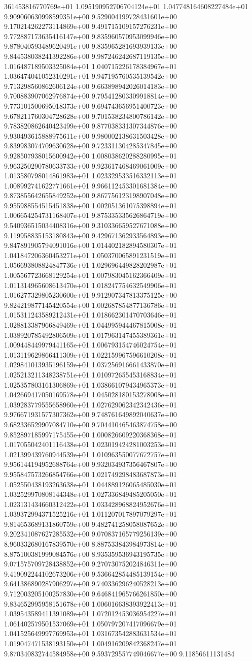 361453816770769e+01	1.095190952706704124e+01	1.047748164608227484e+01	9.909060630998599351e+00	9.529004199728431601e+00	9.170214262273114869e+00	9.491715109157276231e+00	9.772887173635416147e+00	9.835960570953099946e+00	9.878040593489620491e+00	9.835965281693939133e+00	9.844538038241392286e+00	9.987246242687119135e+00	1.016487189503325084e+01	1.040715226178384967e+01	1.036474041052310291e+01	9.947195760535139542e+00	9.713298560862606124e+00	9.663898942026014183e+00	9.700883907062976874e+00	9.795412803309918814e+00	9.773101500695018373e+00	9.694743656951400723e+00	9.678211760304728628e+00	9.701538234800786142e+00	9.783820862640423499e+00	9.877038331307344876e+00	9.930493615888975611e+00	9.980002138631503428e+00	9.839983074709630628e+00	9.723311304285347845e+00	9.928507938015600942e+00	1.008038620288280995e+01	9.963250290780633733e+00	9.923617468469061009e+00	1.013580798014861983e+01	1.023329533516332113e+01	1.008992741622771661e+01	9.966112453301681384e+00	9.873855642655849252e+00	9.867756123198907048e+00	9.955988554515451838e+00	1.002051361075398894e+01	1.006654254731168407e+01	9.875335335626864719e+00	9.540936515034408316e+00	9.310336659527671088e+00	9.119958835153180843e+00	9.429671362933564893e+00	9.847891905794091016e+00	1.014402182894580307e+01	1.041847206360453271e+01	1.050370065891231519e+01	1.056693808824847736e+01	1.029696449828202987e+01	1.005567723668129254e+01	1.007983045162366409e+01	1.011314965608613470e+01	1.018247754632549906e+01	1.016277329805230600e+01	9.912907347813375125e+00	9.824219877145420554e+00	1.002687854877136786e+01	1.015311243589212431e+01	1.018662301470703646e+01	1.028813387966849469e+01	1.044995944467815008e+01	1.038920785492806509e+01	1.017963147455389361e+01	1.009448449979441165e+01	1.006793154746024754e+01	1.013119629866411309e+01	1.022159967596610208e+01	1.029841013935196159e+01	1.037256916661433870e+01	1.025213211348238751e+01	1.010972655453168834e+01	1.025357803161306869e+01	1.038661079434965373e+01	1.042669417050169578e+01	1.045028180153278008e+01	1.039283779555658960e+01	1.027629062342342436e+01	9.976671931577307362e+00	9.748761649892040637e+00	9.682336529907084710e+00	9.704410465463874758e+00	9.852897185997175455e+00	1.000826609220368368e+01	1.017055042401116438e+01	1.023019424281003253e+01	1.021399439760944539e+01	1.010963550077672757e+01	9.956144194952688764e+00	9.932034937356467807e+00	9.955847573266854766e+00	1.021749298483687873e+01	1.052550438193263638e+01	1.044889126065485030e+01	1.032529970808144348e+01	1.027336849485205050e+01	1.023131434660312422e+01	1.033428968824952676e+01	1.039372994371525216e+01	1.011207017897079297e+01	9.814653689131860759e+00	9.482741258058087652e+00	9.202341087627285532e+00	9.070837165779256139e+00	8.960332680167839570e+00	8.887533843984973814e+00	8.875100381999084576e+00	8.935359536943195735e+00	9.071575709728438852e+00	9.270730752024846311e+00	9.419092244102673206e+00	9.536642854485139154e+00	9.641386890287906297e+00	9.740336296240528213e+00	9.712003205100257830e+00	9.646841965766261850e+00	9.834652995958151678e+00	1.006016638393922413e+01	1.039543589411391089e+01	1.072012453036954227e+01	1.061402579501537069e+01	1.050797207417096679e+01	1.041525649997769953e+01	1.031673542883631534e+01	1.019047471538193150e+01	1.004916209842368247e+01	9.870340832744584958e+00	9.593729557749046677e+00	9.11856611131484